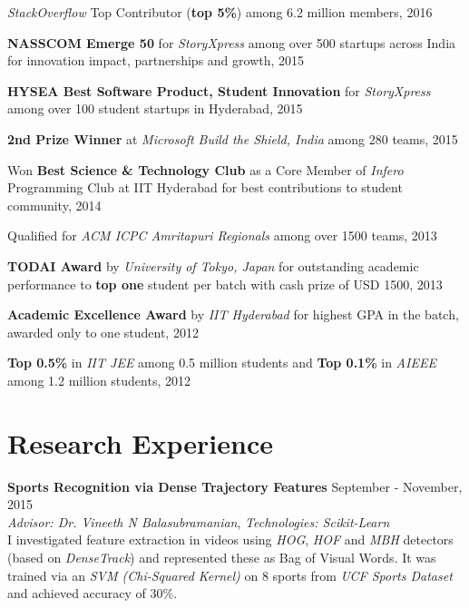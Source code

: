 \documentclass[margin,line]{res}
\begin{document}
\begin{resume}
  {\it StackOverflow} Top Contributor ({\bf top 5\%}) among 6.2 million members, 2016

  \vspace*{-2.5mm}

  {\bf NASSCOM Emerge 50} for {\it StoryXpress} among over 500 startups across India for innovation impact, partnerships and growth, 2015

  \vspace*{-2.5mm}

  {\bf HYSEA Best Software Product, Student Innovation} for {\it StoryXpress} among over 100 student startups in Hyderabad, 2015

  \vspace*{-2.5mm}

  {\bf 2nd Prize Winner} at {\it Microsoft Build the Shield, India} among 280 teams, 2015

  \vspace*{-2.5mm}

  Won {\bf Best Science \& Technology Club} as a Core Member of {\it Infero} Programming Club at IIT Hyderabad for best contributions to student community, 2014

  \vspace*{-2.5mm}

  Qualified for {\it ACM ICPC Amritapuri Regionals} among over 1500 teams, 2013

  \vspace*{-2.5mm}

  {\bf TODAI Award} by {\it University of Tokyo, Japan} for outstanding academic performance to {\bf top one} student per batch with cash prize of USD 1500, 2013

  \vspace*{-2.5mm}

  {\bf Academic Excellence Award} by {\it IIT Hyderabad} for highest GPA in the batch, awarded only to one student, 2012

  \vspace*{-2.5mm}

  {\bf Top 0.5\%} in {\it IIT JEE} among 0.5 million students and {\bf Top 0.1\%} in {\it AIEEE} among 1.2 million students, 2012

\section{\sc Research Experience}

  {\bf Sports Recognition via Dense Trajectory Features} \hfill September - November, 2015 \\
  	{\em Advisor: Dr. Vineeth N Balasubramanian}, {\em Technologies: Scikit-Learn} \\
  	I investigated feature extraction in videos using {\it HOG}, {\it HOF} and {\it MBH} detectors (based on {\it DenseTrack}) and represented these as Bag of Visual Words. It was trained via an {\it SVM (Chi-Squared Kernel)} on 8 sports from {\it UCF Sports Dataset} and achieved accuracy of 30\%.


\end{resume}
\end{document}
